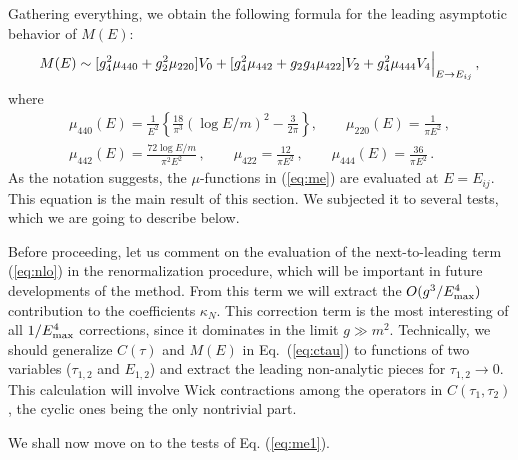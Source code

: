 \documentclass[11pt]{article}
\newcommand{\purp}{\color [rgb]{0.6,0.1,0.7}}
\newcommand{\LV}[1]{{\purp\bf [LV: #1]}}
\newcommand{\reef}[1]{(\ref{#1})}
\newcommand{\beq}{\begin{equation}}
\newcommand{\eeq}{\end{equation}}
\def\nn{\nonumber}
\def \Emax{E_{\rm max}}
\numberwithin{equation}{section}
\begin{document}
Gathering everything, we obtain the following formula for the leading asymptotic behavior of $M(E)$:
\beq
\label{eq:me}
M(E)\sim  [g_4^2 \mu_{440}+ g_2^2 \mu_{220}] V_0 + [g_4^2 \mu_{442}+ g_2 g_4 \mu_{422}]V_2 + g_4^2 \mu_{444} V_4\Bigl|_{E\to E_{ij}}\,,
\eeq
where
\begin{gather}
\mu_{440}(E)=\frac{1}{E^2}\left\{\frac{18}{\pi^3}(\log E/m)^2-\frac{3}{2\pi}\right\},\qquad \mu_{220}(E)=\frac{1}{\pi E^2}\,,\nn\\
\mu_{442}(E)=\frac{72 \log E/m}{\pi^2 E^2}\,,\qquad \mu_{422}=\frac{12}{\pi E^2}\,,\qquad\mu_{444}(E)=\frac{36}{\pi E^2}\,.
\label{eq:me1}
\end{gather}
As the notation suggests, the $\mu$-functions in \reef{eq:me} are evaluated at $E=E_{ij}$.
This equation is the main result of this section. We subjected it to several tests, which we are going to describe below.

Before proceeding, let us comment on the evaluation of the next-to-leading term (\ref{eq:nlo}) in the renormalization procedure, which will be important in future developments of the method. From this term we will 
extract the $O(g^3/\Emax^4)$ contribution to the coefficients $\kappa_N$. This correction term is the most interesting of all $1/\Emax^4$ corrections, since it dominates in the limit $g\gg m^2$. Technically, we should generalize $C(\tau)$ and $M(E)$ in Eq.~\reef{eq:ctau} to functions of two variables ($\tau_{1,2}$ and $E_{1,2}$) and extract the leading non-analytic pieces for $\tau_{1,2} \to 0$. This calculation will involve Wick contractions among the operators in $C(\tau_1,\tau_2)$, the cyclic ones being the only nontrivial part.

We shall now move on to the tests of Eq. (\ref{eq:me1}).

\end{document}
